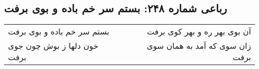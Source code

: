 \begin{center}
\section*{رباعی شماره ۲۴۸: بستم سر خم باده و بوی برفت}
\label{sec:0248}
\begin{longtable}{l p{0.5cm} r}
بستم سر خم باده و بوی برفت
&&
آن بوی بهر ره و بهر کوی برفت
\\
خون دلها ز بوش چون جوی برفت
&&
زان سوی که آمد به همان سوی برفت
\\
\end{longtable}
\end{center}
